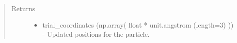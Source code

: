 \documentclass[letterpaper,12pt,english,openany,oneside]{sphinxmanual}
\begin{document}
\begin{fulllineitems}
\begin{quote}
\begin{description}
\begin{itemize}
\end{itemize}

\item[{Returns}] \leavevmode
\begin{itemize}
\item {} 
trial\_coordinates (np.array( float * unit.angstrom (length=3) )) - Updated positions for the particle.

\end{itemize}


\end{description}\end{quote}

\end{fulllineitems}

\end{document}
